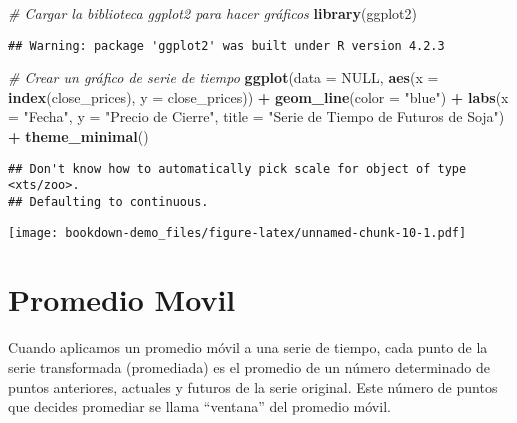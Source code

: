 \documentclass[
]{book}
\newenvironment{Shaded}{\begin{snugshade}}{\end{snugshade}}
\newcommand{\AttributeTok}[1]{\textcolor[rgb]{0.13,0.29,0.53}{#1}}
\newcommand{\CommentTok}[1]{\textcolor[rgb]{0.56,0.35,0.01}{\textit{#1}}}
\newcommand{\ConstantTok}[1]{\textcolor[rgb]{0.56,0.35,0.01}{#1}}
\newcommand{\FunctionTok}[1]{\textcolor[rgb]{0.13,0.29,0.53}{\textbf{#1}}}
\newcommand{\NormalTok}[1]{#1}
\newcommand{\SpecialCharTok}[1]{\textcolor[rgb]{0.81,0.36,0.00}{\textbf{#1}}}
\newcommand{\StringTok}[1]{\textcolor[rgb]{0.31,0.60,0.02}{#1}}
\begin{document}
\begin{Shaded}
\begin{Highlighting}[]
\CommentTok{\# Cargar la biblioteca ggplot2 para hacer gráficos}
\FunctionTok{library}\NormalTok{(ggplot2)}
\end{Highlighting}
\end{Shaded}

\begin{verbatim}
## Warning: package 'ggplot2' was built under R version 4.2.3
\end{verbatim}

\begin{Shaded}
\begin{Highlighting}[]
\CommentTok{\# Crear un gráfico de serie de tiempo}
\FunctionTok{ggplot}\NormalTok{(}\AttributeTok{data =} \ConstantTok{NULL}\NormalTok{, }\FunctionTok{aes}\NormalTok{(}\AttributeTok{x =} \FunctionTok{index}\NormalTok{(close\_prices), }\AttributeTok{y =}\NormalTok{ close\_prices)) }\SpecialCharTok{+}
  \FunctionTok{geom\_line}\NormalTok{(}\AttributeTok{color =} \StringTok{"blue"}\NormalTok{) }\SpecialCharTok{+}
  \FunctionTok{labs}\NormalTok{(}\AttributeTok{x =} \StringTok{"Fecha"}\NormalTok{, }\AttributeTok{y =} \StringTok{"Precio de Cierre"}\NormalTok{, }\AttributeTok{title =} \StringTok{"Serie de Tiempo de Futuros de Soja"}\NormalTok{) }\SpecialCharTok{+}
  \FunctionTok{theme\_minimal}\NormalTok{()}
\end{Highlighting}
\end{Shaded}

\begin{verbatim}
## Don't know how to automatically pick scale for object of type <xts/zoo>.
## Defaulting to continuous.
\end{verbatim}

\texttt{[image: bookdown-demo\_files/figure-latex/unnamed-chunk-10-1.pdf]}

\hypertarget{promedio-movil}{%
\chapter{Promedio Movil}\label{promedio-movil}}

Cuando aplicamos un promedio móvil a una serie de tiempo, cada punto de la serie transformada (promediada) es el promedio de un número determinado de puntos anteriores, actuales y futuros de la serie original. Este número de puntos que decides promediar se llama ``ventana'' del promedio móvil.
\end{document}
